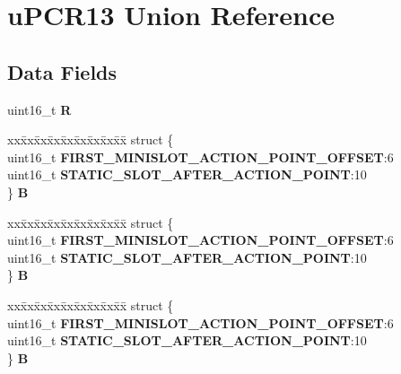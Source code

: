 \hypertarget{unionuPCR13}{}\section{u\+P\+C\+R13 Union Reference}
\label{unionuPCR13}
\subsection*{Data Fields}
\begin{DoxyCompactItemize}
\item 
\mbox{\label{unionuPCR13_aa127018e3e94a1abe69c08165abfa1bd}} 
uint16\+\_\+t {\bfseries R}
\item 
\mbox{\label{unionuPCR13_a1593fe0567ed6a34c893f48a254eabaa}} 
\begin{tabbing}
xx\=xx\=xx\=xx\=xx\=xx\=xx\=xx\=xx\=\kill
struct \{\\
\>uint16\_t {\bfseries FIRST\_MINISLOT\_ACTION\_POINT\_OFFSET}:6\\
\>uint16\_t {\bfseries STATIC\_SLOT\_AFTER\_ACTION\_POINT}:10\\
\} {\bfseries B}\\

\end{tabbing}\item 
\mbox{\label{unionuPCR13_aaf580964a9e84e55d98b0a204f112688}} 
\begin{tabbing}
xx\=xx\=xx\=xx\=xx\=xx\=xx\=xx\=xx\=\kill
struct \{\\
\>uint16\_t {\bfseries FIRST\_MINISLOT\_ACTION\_POINT\_OFFSET}:6\\
\>uint16\_t {\bfseries STATIC\_SLOT\_AFTER\_ACTION\_POINT}:10\\
\} {\bfseries B}\\

\end{tabbing}\item 
\mbox{\label{unionuPCR13_a81db75277d537cccdf7f5091e196c4de}} 
\begin{tabbing}
xx\=xx\=xx\=xx\=xx\=xx\=xx\=xx\=xx\=\kill
struct \{\\
\>uint16\_t {\bfseries FIRST\_MINISLOT\_ACTION\_POINT\_OFFSET}:6\\
\>uint16\_t {\bfseries STATIC\_SLOT\_AFTER\_ACTION\_POINT}:10\\
\} {\bfseries B}\\


\end{tabbing}
\end{DoxyCompactItemize}
